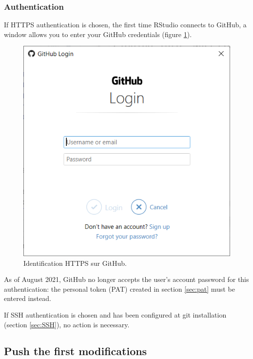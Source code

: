 \documentclass[
  12pt,
  american,
  a4paper,
  extrafontsizes,onecolumn,openright
  ]{memoir}
\begin{document}
\hypertarget{authentication}{%
\subsubsection{Authentication}\label{authentication}}

If HTTPS authentication is chosen, the first time RStudio connects to GitHub, a window allows you to enter your GitHub credentials (figure \ref{fig:git-PAT}).



\scriptsize

\begin{figure}

{\centering \includegraphics[width=0.8\linewidth]{images/git-PAT} 

}

\caption{Identification HTTPS sur GitHub.}\label{fig:git-PAT}
\end{figure}

\normalsize

As of August 2021, GitHub no longer accepts the user's account password for this authentication: the personal token (PAT) created in section \ref{sec:pat} must be entered instead.

If SSH authentication is chosen and has been configured at git installation (section \ref{sec:SSH}), no action is necessary.

\hypertarget{push-the-first-modifications}{%
\subsection{Push the first modifications}\label{push-the-first-modifications}}
\end{document}

